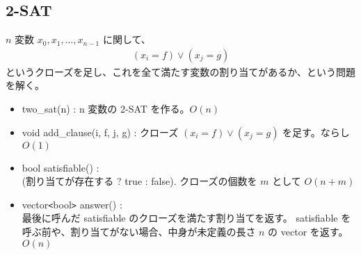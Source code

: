 \subsection{2-SAT}

$n$ 変数 $x_0, x_1, \dots, x_{n-1}$ に関して、
\begin{align*}
    (x_i = f) \vee (x_j = g)
\end{align*}
というクローズを足し、これを全て満たす変数の割り当てがあるか、という問題を解く。
\begin{itemize}
    \item two\_sat(n) : n 変数の 2-SAT を作る。$O(n)$
    \item void add\_clause(i, f, j, g) : クローズ $(x_i = f) \vee (x_j = g)$ を足す。ならし $O(1)$
    \item bool satisfiable() : \\ (割り当てが存在する ? true : false). クローズの個数を $m$ として $O(n + m)$
    \item vector\verb|<|bool\verb|>| answer() :\\ 最後に呼んだ satisfiable のクローズを満たす割り当てを返す。
    satisfiable を呼ぶ前や、割り当てがない場合、中身が未定義の長さ $n$ の vector を返す。$O(n)$
\end{itemize}


